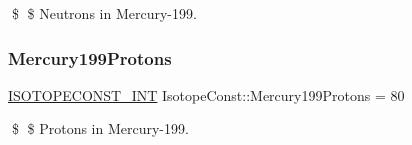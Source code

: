\$ \$ Neutrons in Mercury-\/199. \mbox{\label{group___isotope_const-_mercury-_hg199_ga85f9f14d9eec479ec28a93d496328201}} 
\subsubsection{\texorpdfstring{Mercury199\+Protons}{Mercury199Protons}}
{\footnotesize\ttfamily \mbox{\hyperlink{group___isotope_const-_macros_ga5f18360b3e99483a35c32d789e62621c}{I\+S\+O\+T\+O\+P\+E\+C\+O\+N\+S\+T\+\_\+\+I\+NT}} Isotope\+Const\+::\+Mercury199\+Protons = 80}

\$ \$ Protons in Mercury-\/199. 